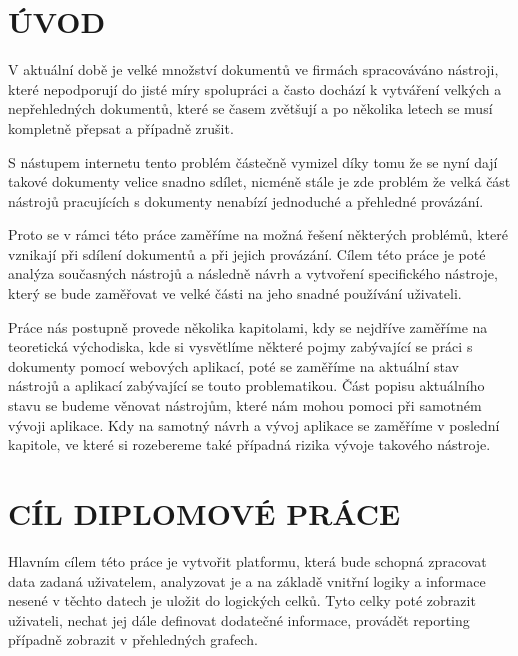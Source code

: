 \chapter*{ÚVOD}
\par V aktuální době je velké množství dokumentů ve firmách spracováváno nástroji, které nepodporují do jisté míry spolupráci a často dochází k vytváření velkých a nepřehledných dokumentů, které se časem zvětšují a po několika letech se musí kompletně přepsat a případně zrušit.

\par S nástupem internetu tento problém částečně vymizel díky tomu že se nyní dají takové dokumenty velice snadno sdílet, nicméně stále je zde problém že velká část nástrojů pracujících s dokumenty nenabízí jednoduché a přehledné provázání.

\par Proto se v rámci této práce zaměříme na možná řešení některých problémů, které vznikají při sdílení dokumentů a při jejich provázání. Cílem této práce je poté analýza současných nástrojů a následně návrh a vytvoření specifického nástroje, který se bude zaměřovat ve velké části na jeho snadné používání uživateli.

\par Práce nás postupně provede několika kapitolami, kdy se nejdříve zaměříme na teoretická východiska, kde si vysvětlíme některé pojmy zabývající se práci s dokumenty pomocí webových aplikací, poté se zaměříme na aktuální stav nástrojů a aplikací zabývající se touto problematikou. Část popisu aktuálního stavu se budeme věnovat nástrojům, které nám mohou pomoci při samotném vývoji aplikace. Kdy na samotný návrh a vývoj aplikace se zaměříme v poslední kapitole, ve které si rozebereme také případná rizika vývoje takového nástroje.

\chapter*{CÍL DIPLOMOVÉ PRÁCE}
Hlavním cílem této práce je vytvořit platformu, která bude schopná zpracovat data zadaná uživatelem, analyzovat je a na základě vnitřní logiky a informace nesené v těchto datech je uložit do logických celků. Tyto celky poté zobrazit uživateli, nechat jej dále definovat dodatečné informace, provádět reporting případně zobrazit v přehledných grafech.

